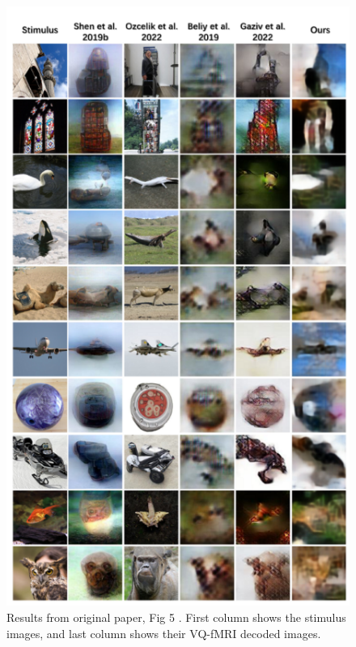\documentclass{article}
\theoremstyle{plain}
\theoremstyle{definition}
\theoremstyle{remark}
\begin{document}
\begin{figure}[!t]
\begin{center}
\centerline{\includegraphics[width=\columnwidth]{orig-figure}}
\caption{Results from original paper, Fig 5 \citep{chenRethinkingVisualReconstruction2023}. First column shows the stimulus images, and last column shows their VQ-fMRI decoded images.}
\label{orig-figure}
\end{center}
\vskip -0.2in
\end{figure}
\end{document}

